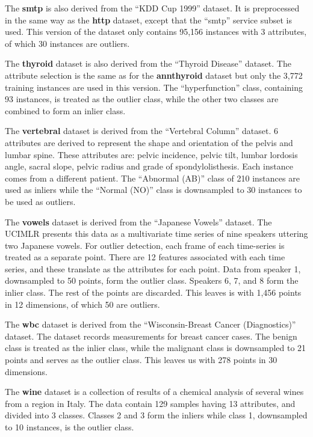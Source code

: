 \documentclass{article}
\begin{document}
The \textbf{smtp} is also derived from the ``KDD Cup 1999'' dataset.
It is preprocessed in the same way as the \textbf{http} dataset, except that the ``smtp'' service subset is used.
This version of the dataset only contains 95,156 instances with 3 attributes, of which 30 instances are outliers.

The \textbf{thyroid} dataset is also derived from the ``Thyroid Disease'' dataset.
The attribute selection is the same as for the \textbf{annthyroid} dataset but only the 3,772 training instances are used in this version.
The ``hyperfunction'' class, containing 93 instances, is treated as the outlier class, while the other two classes are combined to form an inlier class.

The \textbf{vertebral} dataset is derived from the ``Vertebral Column'' dataset.
6 attributes are derived to represent the shape and orientation of the pelvis and lumbar spine.
These attributes are: pelvic incidence, pelvic tilt, lumbar lordosis angle, sacral slope, pelvic radius and grade of spondylolisthesis.
Each instance comes from a different patient.
The ``Abnormal (AB)'' class of 210 instances are used as inliers while the ``Normal (NO)'' class is downsampled to 30 instances to be used as outliers.

The \textbf{vowels} dataset is derived from the ``Japanese Vowels'' dataset.
The UCIMLR presents this data as a multivariate time series of nine speakers uttering two Japanese vowels.
For outlier detection, each frame of each time-series is treated as a separate point.
There are 12 features associated with each time series, and these translate as the attributes for each point.
Data from speaker 1, downsampled to 50 points, form the outlier class.
Speakers 6, 7, and 8 form the inlier class.
The rest of the points are discarded.
This leaves is with 1,456 points in 12 dimensions, of which 50 are outliers.

The \textbf{wbc} dataset is derived from the ``Wisconsin-Breast Cancer (Diagnostics)'' dataset.
The dataset records measurements for breast cancer cases.
The benign class is treated as the inlier class, while the malignant class is downsampled to 21 points and serves as the outlier class.
This leaves us with 278 points in 30 dimensions.

The \textbf{wine} dataset is a collection of results of a chemical analysis of several wines from a region in Italy.
The data contain 129 samples having 13 attributes, and divided into 3 classes.
Classes 2 and 3 form the inliers while class 1, downsampled to 10 instances, is the outlier class.
\end{document}
